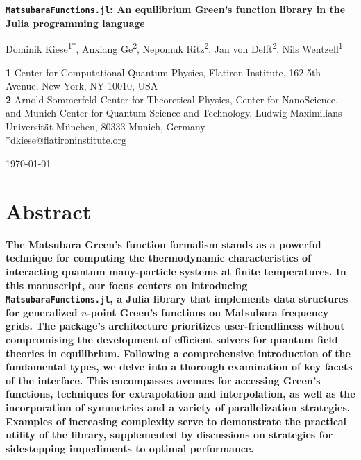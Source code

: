 \documentclass{SciPost}
\begin{document}
\begin{center}{\Large \textbf{
\texttt{MatsubaraFunctions.jl}: An equilibrium Green's function library in the Julia programming language}}\end{center}

\begin{center}
    Dominik Kiese\textsuperscript{1*}, 
    Anxiang Ge\textsuperscript{2}, 
    Nepomuk Ritz\textsuperscript{2},
    Jan von Delft\textsuperscript{2},
    Nils Wentzell\textsuperscript{1}
\end{center}
 
\begin{center}
    {\bf 1} Center for Computational Quantum Physics, Flatiron Institute, 162 5th Avenue, New York, NY 10010, USA
    \\
    {\bf 2} Arnold Sommerfeld Center for Theoretical Physics, Center for NanoScience, and Munich Center for Quantum Science and Technology, Ludwig-Maximilians-Universit\"at M\"unchen, 80333 Munich, Germany
    \\
    *dkiese@flatironinstitute.org
\end{center}

\begin{center}
\today
\end{center}


\section*{Abstract}
{\bf The Matsubara Green's function formalism stands as a powerful technique for computing the thermodynamic characteristics of interacting quantum many-particle systems at finite temperatures. In this manuscript, our focus centers on introducing \texttt{MatsubaraFunctions.jl}, a Julia library that implements data structures for generalized $n$-point Green's functions on Matsubara frequency grids. The package's architecture prioritizes user-friendliness without compromising the development of efficient solvers for quantum field theories in equilibrium. Following a comprehensive introduction of the fundamental types, we delve into a thorough examination of key facets of the interface. This encompasses avenues for accessing Green's functions, techniques for extrapolation and interpolation, as well as the incorporation of symmetries and a variety of parallelization strategies. Examples of increasing complexity serve to demonstrate the practical utility of the library, supplemented by discussions on strategies for sidestepping impediments to optimal performance.}
\end{document}
